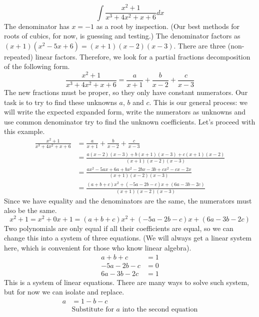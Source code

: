\documentclass[fleqn]{report}
\begin{document}
\begin{example}
\begin{equation*}
\int \frac{x^2+1}{x^3+4x^2+x+6} dx
\end{equation*}
The denominator has $x=-1$ as a root by inspection. (Our
best methods for roots of cubics, for now, is guessing and
testing.) The denominator factors as $(x+1)(x^2-5x+6) =
(x+1)(x-2)(x-3)$. There are three (non-repeated) linear
factors. Therefore, we look for a partial fractions
decomposition of the following form.
\begin{equation*}
\frac{x^2+1}{x^3+4x^2+x+6} = \frac{a}{x+1} + \frac{b}{x-2} +
\frac{c}{x-3} 
\end{equation*}
The new fractions must be proper, so they only have
constant numerators. Our task is to try to find these
unknowns $a$, $b$ and $c$. This is our general process: we
will write the expected expanded form, write the numerators as
unknowns and use common denominator try to find the unknown
coefficients. Let's proceed with this example.
\begin{align*}
\frac{x^2+1}{x^3+4x^2+x+6} & = \frac{a}{x+1} + \frac{b}{x-2} +
\frac{c}{x-3} \\
& = \frac{a(x-2)(x-3) + b(x+1)(x-3) + c(x+1)(x-2)}
{(x+1)(x-2)(x-3)} \\ 
& = \frac{ax^2 -5ax + 6a + bx^2 - 2bx - 3b + cx^2 - cx - 2x}
{(x+1)(x-2)(x-3)} \\ 
& = \frac{(a+b+c)x^2 + (-5a-2b-c)x + (6a-3b-2c)}
{(x+1)(x-2)(x-3)} \
\end{align*}
Since we have equality and the denominators are the same, the
numerators must also be the same.
\begin{equation*}
x^2 + 1 = x^2 + 0x + 1= (a+b+c)x^2 + (-5a-2b-c)x + (6a-3b-2c)
\end{equation*}
Two polynomials are only equal if all their coefficients are
equal, so we can change this into a system of three equations.
(We will always get a linear system here, which is convenient
for those who know linear algebra).
\begin{align*}
a+b+c & = 1 \\
-5a-2b-c & = 0 \\
6a-3b-2c & = 1 
\end{align*}
This is a system of linear equations. There are many ways to
solve such system, but for now we can isolate and replace.
\begin{align*}
a & = 1-b-c \\
& \text{Substitute for $a$ into the second equation} \\

\end{align*}
\end{example}
\end{document}
